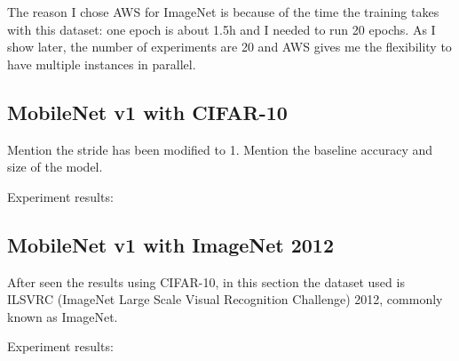 The reason I chose AWS for ImageNet is because of the time the training takes
with this dataset: one epoch is about 1.5h and I needed to run 20 epochs.
As I show later, the number of experiments are 20 and AWS gives me the
flexibility to have multiple instances in parallel.

\subsection{MobileNet v1 with CIFAR-10}
Mention the stride has been modified to 1.
Mention the baseline accuracy and size of the model.

Experiment results: 

\subsection{MobileNet v1 with ImageNet 2012}
After seen the results using CIFAR-10, in this section the dataset used is
ILSVRC (ImageNet Large Scale Visual Recognition Challenge) 2012, commonly known
as ImageNet.

Experiment results: 
